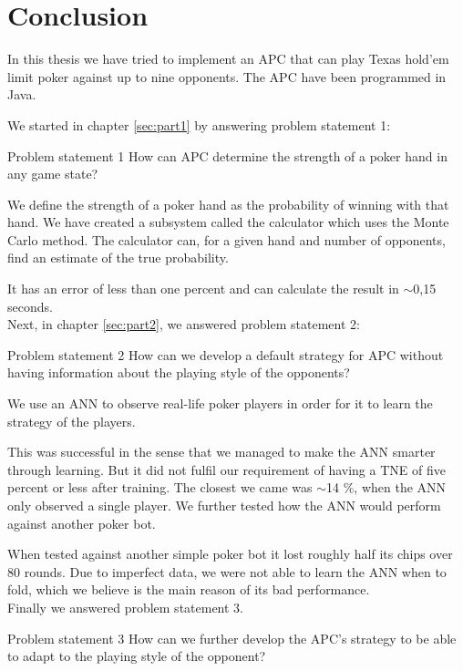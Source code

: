 \section{Conclusion}
In this thesis we have tried to implement an APC that can play Texas hold'em limit poker against up to nine opponents. The APC have been programmed in Java.

We started in chapter \ref{sec:part1} by answering problem statement 1:
\vspace{4mm}
\begin{statementBox2}{Problem statement 1}
How can APC determine the strength of a poker hand in any game state?
\end{statementBox2}
\vspace{4mm}

We define the strength of a poker hand as the probability of winning with that hand.
We have created a subsystem called the calculator which uses the Monte Carlo method. The calculator can, for a given hand and number of opponents, find an estimate of the true probability. 

It has an error of less than one percent and can calculate the result in $\sim$0,15 seconds.\\

Next, in chapter \ref{sec:part2}, we answered problem statement 2:
\vspace{4mm}
\begin{statementBox2}{Problem statement 2}
How can we develop a default strategy for APC without having information about the playing style of the opponents?
\end{statementBox2}
\vspace{4mm}

We use an ANN to observe real-life poker players in order for it to learn the strategy of the players. 

This was successful in the sense that we managed to make the ANN smarter through learning. But it did not fulfil our requirement of having a TNE of five percent or less after training. The closest we came was $\sim$14 \%, when the ANN only observed a single player. 
We further tested how the ANN would perform against another poker bot. 

When tested against another simple poker bot it lost roughly half its chips over 80 rounds. Due to imperfect data, we were not able to learn the ANN when to fold, which we believe is the main reason of its bad performance.\\

Finally we answered problem statement 3.
\vspace{4mm}
\begin{statementBox2}{Problem statement 3}
How can we further develop the APC's strategy to be able to adapt to the playing style of the opponent?
\end{statementBox2}
\vspace{4mm}

